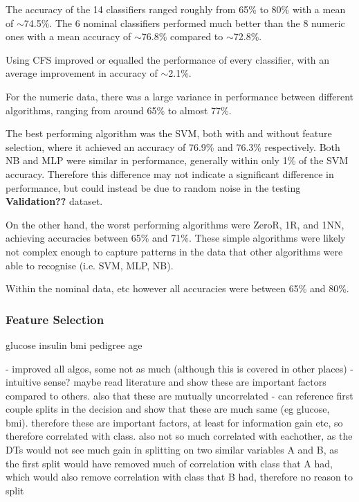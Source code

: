 The accuracy of the 14 classifiers ranged roughly from 65\% to 80\% with a mean of $\sim$74.5\%. The 6 nominal classifiers performed much better than the 8 numeric ones with a mean accuracy of $\sim$76.8\% compared to $\sim$72.8\%.

Using CFS improved or equalled the performance of every classifier, with an average improvement in accuracy of $\sim$2.1\%.

For the numeric data, there was a large variance in performance between different algorithms, ranging from around 65\% to almost 77\%.

The best performing algorithm was the SVM, both with and without feature selection, where it achieved an accuracy of 76.9\% and 76.3\% respectively. Both NB and MLP were similar in performance, generally within only 1\% of the SVM accuracy. Therefore this difference may not indicate a significant difference in performance, but could instead be due to random noise in the testing \textbf{Validation??} dataset.

On the other hand, the worst performing algorithms were ZeroR, 1R, and 1NN, achieving accuracies between 65\% and 71\%. These simple algorithms were likely not complex enough to capture patterns in the data that other algorithms were able to recognise (i.e. SVM, MLP, NB).


Within the nominal data, etc
however all accuracies were between 65\% and 80\%.






\subsubsection{Feature Selection}


glucose
insulin
bmi
pedigree
age

- improved all algos, some not as much (although this is covered in other places)
- intuitive sense? maybe read literature and show these are important factors compared to others. also that these are mutually uncorrelated
- can reference first couple splits in the decision and show that these are much same (eg glucose, bmi). therefore these are important factors, at least for information gain etc, so therefore correlated with class. also not so much correlated with eachother, as the DTs would not see much gain in splitting on two similar variables A and B, as the first split would have removed much of correlation with class that A had, which would also remove correlation with class that B had, therefore no reason to split


